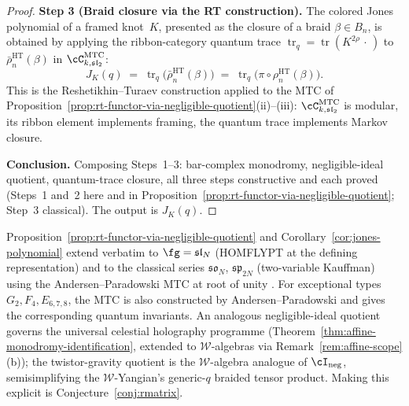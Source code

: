 \begin{proof}
\medskip
\noindent\textbf{Step 3 (Braid closure via the RT construction).}
The colored Jones polynomial of a framed knot~$K$, presented as the closure of a braid $\beta \in B_n$, is obtained by applying the ribbon-category quantum trace $\operatorname{tr}_q = \operatorname{tr}(K^{2\rho} \,\cdot\,)$ to $\bar\rho_n^{\mathrm{HT}}(\beta)$ in $\cC^{\mathrm{MTC}}_{k,\mathfrak{sl}_2}$:
\[
 J_K(q) \;=\; \operatorname{tr}_q\bigl(\bar\rho_n^{\mathrm{HT}}(\beta)\bigr)
 \;=\; \operatorname{tr}_q\bigl(\pi \circ \rho_n^{\mathrm{HT}}(\beta)\bigr).
\]
This is the Reshetikhin--Turaev construction \cite{RT90} applied to the MTC of Proposition~\ref{prop:rt-functor-via-negligible-quotient}(ii)--(iii): $\cC^{\mathrm{MTC}}_{k,\mathfrak{sl}_2}$ is modular, its ribbon element implements framing, the quantum trace implements Markov closure.

\medskip
\noindent\textbf{Conclusion.}
Composing Steps~1--3: bar-complex monodromy, negligible-ideal quotient, quantum-trace closure, all three steps constructive and each proved (Steps~1 and~2 here and in Proposition~\ref{prop:rt-functor-via-negligible-quotient}; Step~3 classical). The output is $J_K(q)$.
\end{proof}

\begin{remark}
\label{rem:rt-scope}
Proposition~\ref{prop:rt-functor-via-negligible-quotient} and Corollary~\ref{cor:jones-polynomial} extend verbatim to $\fg = \mathfrak{sl}_N$ (HOMFLYPT at the defining representation) and to the classical series $\mathfrak{so}_N$, $\mathfrak{sp}_{2N}$ (two-variable Kauffman) using the Andersen--Paradowski MTC at root of unity \cite{AP95}. For exceptional types $G_2, F_4, E_{6,7,8}$, the MTC is also constructed by Andersen--Paradowski and gives the corresponding quantum invariants. An analogous negligible-ideal quotient governs the universal celestial holography programme (Theorem~\ref{thm:affine-monodromy-identification}, extended to $\mathcal{W}$-algebras via Remark~\ref{rem:affine-scope}(b)); the twistor-gravity quotient is the $\mathcal{W}$-algebra analogue of $\cI_{\mathrm{neg}}$, semisimplifying the $\mathcal{W}$-Yangian's generic-$q$ braided tensor product. Making this explicit is Conjecture~\ref{conj:rmatrix}.
\end{remark}

